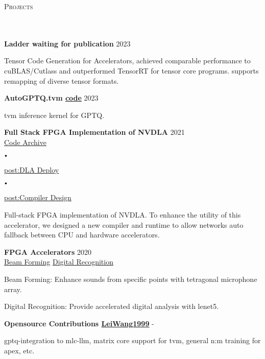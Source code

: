\documentclass{article}
\newcommand{\header}[1]{{
\hspace*{-15pt}\vspace*{6pt} \textsc{#1}} \vspace*{-6pt} 
\lineunder
}
\newcommand{\lineunder}{
\vspace*{-8pt} \\ \hspace*{-18pt} 
\hrulefill \\
}
\newcommand{\project}[3]{{
\vspace*{2pt}%
\textbf{#1} \hfill #2\\ #3 \vspace*{2pt}}
}
\renewcommand{\labelitemi}{
$\vcenter{\hbox{\tiny$\bullet$}}$\hspace*{3pt}
}
\renewcommand{\labelitemii}{
$\vcenter{\hbox{\tiny$\bullet$}}$\hspace*{-3pt}
}
\newcommand{\myhref}[2]{%
\href{#1}{\textcolor{ColorTwo}{#2}}
}
\newenvironment{bullet-list-minor}{
\begin{list}{\labelitemii}{\setlength\leftmargin{15pt} 
\topsep 0pt \itemsep -2pt}}{\vspace*{4pt}\end{list}
}
\begin{document}
\vspace*{4pt}%
\header{Projects}
    \project{Ladder \textcolor{ColorOne}
{waiting for publication}}{2023}{}
    \begin{bullet-list-minor}
	\item Tensor Code Generation for Accelerators, achieved comparable performance to cuBLAS/Cutlass and outperformed TensorRT for tensor core programs. supports remapping of diverse tensor formats.
    \end{bullet-list-minor}
    \project{AutoGPTQ.tvm     \textcolor{ColorTwo}{\faGithub} 
\myhref{https://github.com/LeiWang1999/AutoGPTQ.tvm}{code}}{2023}{}
    \begin{bullet-list-minor}
	\item tvm inference kernel for GPTQ.
    \end{bullet-list-minor}
    \project{Full Stack FPGA Implementation of NVDLA}{2021}{
    \textcolor{ColorTwo}{\faGithub} 
\myhref{https://github.com/LeiWang1999/ZYNQ-NVDLA}{Code Archive}
    \labelitemi
    \textcolor{ColorTwo}{\faBook} 
\myhref{https://zhuanlan.zhihu.com/p/378202360}{post:DLA Deploy}
    \labelitemi
        \textcolor{ColorTwo}{\faBook} 
    \myhref{https://zhuanlan.zhihu.com/p/401943271}{post:Compiler Design}
}
	\begin{bullet-list-minor}
	\item Full-stack FPGA implementation of NVDLA. To enhance the utility of this accelerator, we designed a new compiler and runtime to allow networks auto fallback between CPU and hardware
                accelerators.
    \end{bullet-list-minor}
    \project{FPGA Accelerators}{2020}{
    \textcolor{ColorTwo}{\faVideoCamera} 
    \myhref{https://leiblog.wang/ZYNQ\%E5\%A3\%B0\%E6\%BA\%90\%E5\%AE\%9A\%E4\%BD\%8D\%E6\%B3\%A2\%E6\%9D\%9F\%E5\%BD\%A2\%E6\%88\%90/}{Beam Forming} \textcolor{ColorTwo}{\faVideoCamera} 
    \myhref{https://leiblog.wang/FPGA\%E8\%BD\%A6\%E7\%89\%8C\%E8\%AF\%86\%E5\%88\%AB/}{Digital Recognition}
    }
	\begin{bullet-list-minor}
	\item Beam Forming: Enhance sounds from specific points with tetragonal microphone array.
	\item Digital Recognition: Provide accelerated digital analysis with lenet5.
    \end{bullet-list-minor}
    \project{Opensource Contributions     \textcolor{ColorTwo}{\faGithub} 
    \myhref{https://github.com/LeiWang1999}{LeiWang1999}}{-}{
}
	\begin{bullet-list-minor}
	\item gptq-integration to mlc-llm, matrix core support for tvm, general n:m training for apex, etc.
    \end{bullet-list-minor}
 
\end{document}
